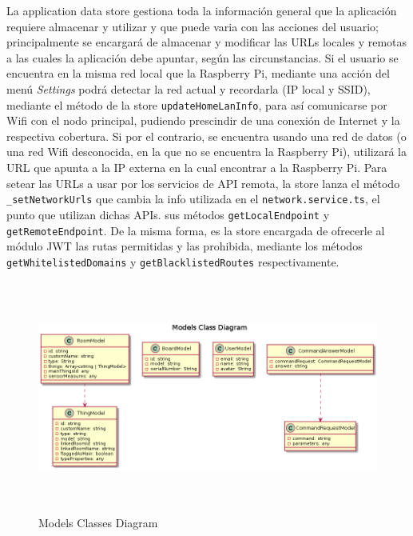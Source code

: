 \vspace{0.5cm}

La application data store gestiona toda la información general que la aplicación requiere almacenar y utilizar y que puede varia con las acciones del usuario; principalmente se encargará de almacenar y modificar las URLs locales y remotas a las cuales la aplicación debe apuntar, según las circunstancias.
Si el usuario se encuentra en la misma red local que la Raspberry Pi, mediante una acción del menú \textit{Settings} podrá detectar la red actual y recordarla (IP local y SSID), mediante el método de la store \verb|updateHomeLanInfo|, para así comunicarse por Wifi con el nodo principal, pudiendo prescindir de una conexión de Internet y la respectiva cobertura. Si por el contrario, se encuentra usando una red de datos (o una red Wifi desconocida, en la que no se encuentra la Raspberry Pi), utilizará la URL que apunta a la IP externa en la cual encontrar a la Raspberry Pi. Para setear las URLs a usar por los servicios de API remota, la store lanza el método \verb|_setNetworkUrls| que cambia la info utilizada en el \verb|network.service.ts|, el punto que utilizan dichas APIs. sus métodos \verb|getLocalEndpoint| y \verb|getRemoteEndpoint|.
De la misma forma, es la store encargada de ofrecerle al módulo JWT las rutas permitidas y las prohibida, mediante los métodos \verb|getWhitelistedDomains| y \verb|getBlacklistedRoutes| respectivamente.

\begin{figure}[hbt!]
\centering
\includegraphics[height=3in]{figures/diagrams/front/architecture/models.png}
\caption[models]{Models Classes Diagram\footnotemark}
\end{figure}

\vspace{1cm}

